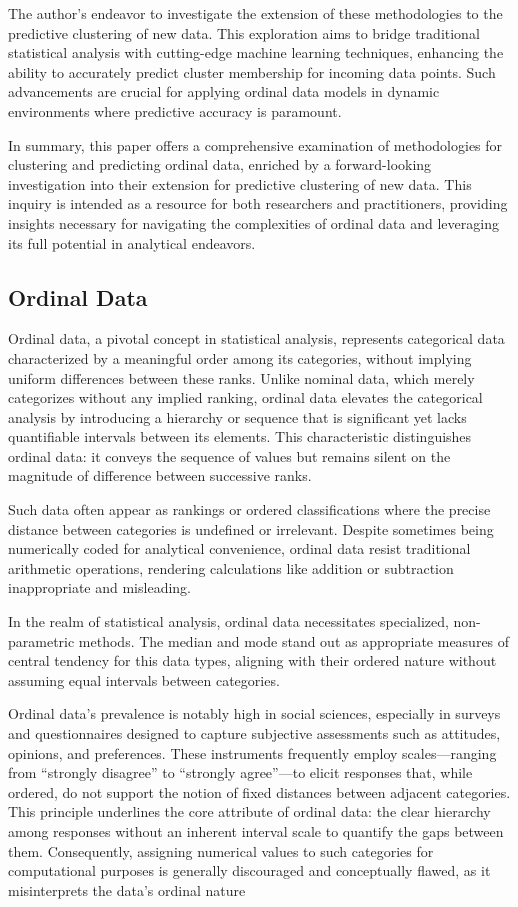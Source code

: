 \documentclass{article}
\begin{document}
The author's endeavor to investigate the extension of these methodologies to the predictive clustering of new data. 
This exploration aims to bridge traditional statistical analysis with cutting-edge machine learning techniques, enhancing the ability to accurately predict cluster membership for incoming data points. 
Such advancements are crucial for applying ordinal data models in dynamic environments where predictive accuracy is paramount.

In summary, this paper offers a comprehensive examination of methodologies for clustering and predicting ordinal data, enriched by a forward-looking investigation into their extension for predictive clustering of new data. This inquiry is intended as a resource for both researchers and practitioners, providing insights necessary for navigating the complexities of ordinal data and leveraging its full potential in analytical endeavors.

\subsection{Ordinal Data}

Ordinal data, a pivotal concept in statistical analysis, represents categorical data characterized by a meaningful order among its categories, without implying uniform differences between these ranks. Unlike nominal data, which merely categorizes without any implied ranking, ordinal data elevates the categorical analysis by introducing a hierarchy or sequence that is significant yet lacks quantifiable intervals between its elements. This characteristic distinguishes ordinal data: it conveys the sequence of values but remains silent on the magnitude of difference between successive ranks.

Such data often appear as rankings or ordered classifications where the precise distance between categories is undefined or irrelevant. 
Despite sometimes being numerically coded for analytical convenience, ordinal data resist traditional arithmetic operations, rendering calculations like addition or subtraction inappropriate and misleading.

In the realm of statistical analysis, ordinal data necessitates specialized, non-parametric methods. 
The median and mode stand out as appropriate measures of central tendency for this data types, 
aligning with their ordered nature without assuming equal intervals between categories.

Ordinal data's prevalence is notably high in social sciences, especially in surveys and questionnaires designed to capture subjective assessments such as attitudes, opinions, and preferences. These instruments frequently employ scales—ranging from ``strongly disagree'' to ``strongly agree''—to elicit responses that, while ordered, do not support the notion of fixed distances between adjacent categories. This principle underlines the core attribute of ordinal data: the clear hierarchy among responses without an inherent interval scale to quantify the gaps between them. Consequently, assigning numerical values to such categories for computational purposes is generally discouraged and conceptually flawed, as it misinterprets the data's ordinal nature 
\end{document}
